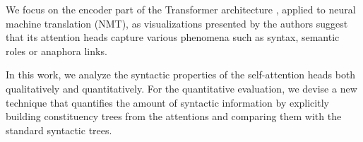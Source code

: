 \documentclass[11pt,a4paper]{article}
\def\DM#1{{\color{red}DM: \it #1}}
\def\JL#1{{\color{magenta}JL: \it #1}}
\def\JL#1{}
\def\DM#1{}
\begin{document}

We focus on the encoder part of the Transformer architecture \cite{vaswani2017attention}, applied to neural machine translation (NMT),
as
visualizations presented by the authors suggest that its attention heads capture various phenomena such as syntax, semantic roles or anaphora links.

In this work, we analyze the syntactic properties of the self-attention heads both qualitatively and quantitatively. For the quantitative evaluation, we devise a new technique that quantifies
the amount of syntactic information by explicitly building constituency trees from the attentions and comparing them
with the standard syntactic trees.



%
%
%
%

\end{document}
